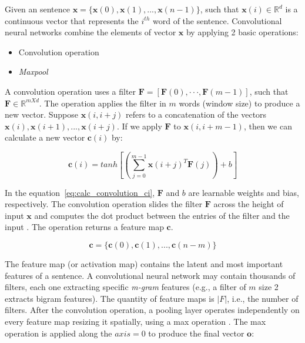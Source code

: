 \documentclass[sigconf]{acmart}
\begin{document}
Given an sentence $\bm{x} = \{ \bm{x}(0), \bm{x}(1), . . ., \bm{x}(n - 1) \}$, such that $\bm{x}(i) \in \mathbb{R}^{d}$ is a continuous vector that represents the $i^{th}$ word of the sentence. Convolutional neural networks combine the elements of vector $\bm{x}$ by applying 2 basic operations:

\begin{itemize}
    \item Convolution operation
    \item \textit{Maxpool}
\end{itemize}

A convolution operation uses a filter $\bm{F}  = [\bm{F}(0),· · ·, \bm{F}(m - 1)]$, such that $\bm{F} \in \mathbb{R}^{m X d}$. The operation applies the filter in $m$ words (window size) to produce a new vector. Suppose $\bm{x}(i, i + j)$ refers to a concatenation of the vectors $\bm{x}(i), \bm{x}(i + 1), . . ., \bm{x}(i + j)$. If we apply $\bm{F}$ to $\bm{x}(i, i + m - 1)$, then we can calculate a new vector $\bm{c}(i)$ by:

\begin{equation}\label{eq:calc_convolution_ci}
    \bm{c}(i) = tanh \left[\left(\sum_{j=0}^{m - 1} \bm{x}(i + j)^{T}\bm{F}(j)\right) + b\right]
\end{equation}

In the equation~\ref{eq:calc_convolution_ci}, $\bm{F}$ and $b$ are learnable weights and bias, respectively. The convolution operation slides the filter $\bm{F}$ across the height of input $\bm{x}$ and computes the dot product between the entries of the filter and the input \cite{karpathy-course-cnn-2016}. The operation returns a feature map $\bm{c}$.

\begin{equation}
    \bm{c} = \{ \bm{c}(0), \bm{c}(1), . . ., \bm{c}(n - m) \} 
\end{equation}

The feature map (or activation map) contains the latent and most important features of a sentence. A convolutional neural network may contain thousands of filters, each one extracting specific \emph{m-gram} features (e.g., a filter of $m$ size 2 extracts bigram features). The quantity of feature maps is $|F|$, i.e., the number of filters. After the convolution operation, a pooling layer operates independently on every feature map resizing it spatially, using a max operation \cite{karpathy-course-cnn-2016}. The max operation is applied along the $axis=0$ to produce the final vector $\bm{o}$:
\end{document}
